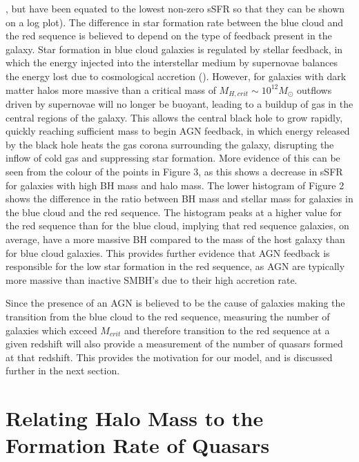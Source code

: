 \documentclass[12pt, twocolumn]{article}%
\begin{document}
, but have been equated to the lowest non-zero sSFR so that they can be shown on a log plot). The difference in star formation rate between the blue cloud and the red sequence is believed to depend on the type of feedback present in the galaxy. Star formation in blue cloud galaxies is regulated by  stellar feedback, in which the energy injected into the interstellar medium by supernovae balances the energy lost due to cosmological accretion (\cite{Ikea}). However, for galaxies with dark matter halos more massive than a critical mass of $M_{H,crit}\sim10^{12}M_\odot$ outflows driven by supernovae will no longer be buoyant, leading to a buildup of gas in the central regions of the galaxy. This allows the central black hole to grow rapidly, quickly reaching sufficient mass to begin AGN feedback, in which energy released by the black hole heats the gas corona surrounding the galaxy, disrupting the inflow of cold gas and suppressing star formation. More evidence of this can be seen from the colour of the points in Figure 3, as this shows a decrease in sSFR for galaxies with high BH mass and halo mass. The lower histogram of Figure 2 shows the difference in the ratio between BH mass and stellar mass for galaxies in the blue cloud and the red sequence. The histogram peaks at a higher value for the red sequence than for the blue cloud, implying that red sequence galaxies, on average, have a more massive BH compared to the mass of the host galaxy than for blue cloud galaxies. This provides further evidence that AGN feedback is responsible for the low star formation in the red sequence, as AGN are typically more massive than inactive SMBH's due to their high accretion rate.\par

\vspace*{1cm}

Since the presence of an AGN is believed to be the cause of galaxies making the transition from the blue cloud to the red sequence, measuring the number of galaxies which exceed $M_{crit}$ and therefore transition to the red sequence at a given redshift will also provide a measurement of the number of quasars formed at that redshift. This provides the motivation for our model, and is discussed further in the next section.

\vspace*{2cm}

\section{Relating Halo Mass to the Formation Rate of Quasars}
\end{document}
